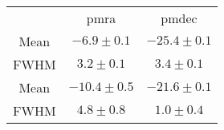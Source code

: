 \begin{table}
\begin{tabular}{ccc}
 & pmra & pmdec \\
Mean & $-6.9\pm0.1$ & $-25.4\pm0.1$ \\
FWHM & $3.2\pm0.1$ & $3.4\pm0.1$ \\
Mean & $-10.4\pm0.5$ & $-21.6\pm0.1$ \\
FWHM & $4.8\pm0.8$ & $1.0\pm0.4$ \\
\end{tabular}
\end{table}
